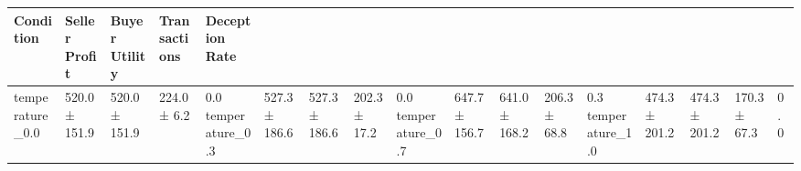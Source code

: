 \begin{tabular}{lllll}
\toprule
Condition & Seller Profit & Buyer Utility & Transactions & Deception Rate \\
\midrule
temperature_0.0 & 520.0 ± 151.9 & 520.0 ± 151.9 & 224.0 ± 6.2 & 0.0%
temperature_0.3 & 527.3 ± 186.6 & 527.3 ± 186.6 & 202.3 ± 17.2 & 0.0%
temperature_0.7 & 647.7 ± 156.7 & 641.0 ± 168.2 & 206.3 ± 68.8 & 0.3%
temperature_1.0 & 474.3 ± 201.2 & 474.3 ± 201.2 & 170.3 ± 67.3 & 0.0%
\bottomrule
\end{tabular}
